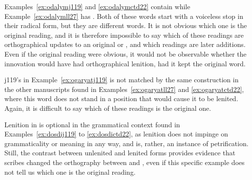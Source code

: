Examples~\ref{ex:odalymj119} and \ref{ex:odalymctd22} contain  while Example~\ref{ex:odalymll27} has . Both of these words start with a voiceless stop in their radical form, but they are different words. It is not obvious which one is the original reading, and it is therefore impossible to say which of these readings are orthographical updates to an original  or , and which readings are later additions. Even if the original reading were obvious, it would not be observable whether the innovation would have had orthographical lenition, had it kept the original word.

\begin{mwl}
\end{mwl}
\Gls{j119}'s  in Example~\ref{ex:ogaryatj119} is not matched by the same construction in the other manuscripts found in Examples~\ref{ex:ogaryatll27} and \ref{ex:ogaryatctd22}, where this word does not stand in a position that would cause it to be lenited. Again, it is difficult to say which of these readings is the original one.

\begin{mwl}
\end{mwl}

Lenition in  is optional in the grammatical context found in Examples~\ref{ex:dosdij119} to \ref{ex:dosdictd22}, as lenition does not impinge on grammaticality or meaning in any way, and is, rather, an instance of petrification. Still, the contrast between unlenited and lenited forms provides evidence that scribes changed the orthography between  and , even if this specific example does not tell us which one is the original reading.

